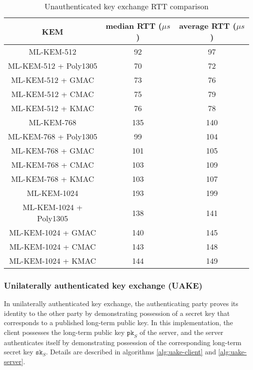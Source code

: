 \documentclass[floatrow,journal=tches,submission]{iacrtrans}
\newcommand{\pk}{\texttt{pk}}
\newcommand{\sk}{\texttt{sk}}
\newcommand{\us}{\mu s}
\begin{document}
\begin{table}[H]
    \caption{Unauthenticated key exchange RTT comparison}\label{tbl:ke-rtt}
    \begin{tabular}{|c|c|c|}
        \hline
        KEM & median RTT ($\us$) & average RTT ($\us$) \\
        \hline
        ML-KEM-512 & 92 & 97 \\
        \hline
        ML-KEM-512 + Poly1305 & 70 & 72 \\
        \hline
        ML-KEM-512 + GMAC & 73 & 76 \\
        \hline
        ML-KEM-512 + CMAC & 75 & 79 \\
        \hline
        ML-KEM-512 + KMAC & 76 & 78 \\
        \hline 
        ML-KEM-768 & 135 & 140 \\
        \hline
        ML-KEM-768 + Poly1305 & 99 & 104 \\
        \hline
        ML-KEM-768 + GMAC & 101 & 105 \\
        \hline
        ML-KEM-768 + CMAC & 103 & 109 \\
        \hline
        ML-KEM-768 + KMAC & 103 & 107 \\
        \hline
        ML-KEM-1024 & 193 & 199 \\
        \hline
        ML-KEM-1024 + Poly1305 & 138 & 141 \\
        \hline
        ML-KEM-1024 + GMAC & 140 & 145 \\
        \hline
        ML-KEM-1024 + CMAC & 143 & 148 \\
        \hline
        ML-KEM-1024 + KMAC & 144 & 149 \\
        \hline
    \end{tabular}
\end{table}

\subsubsection{Unilaterally authenticated key exchange (UAKE)}\label{sec:uakex}
In unilaterally authenticated key exchange, the authenticating party proves its identity to the other party by demonstrating possession of a secret key that corresponds to a published long-term public key. In this implementation, the client possesses the long-term public key $\pk_S$ of the server, and the server authenticates itself by demonstrating possession of the corresponding long-term secret key $\sk_S$. Details are described in algorithms \ref{alg:uake-client} and \ref{alg:uake-server}.
\end{document}
